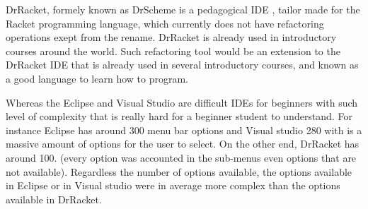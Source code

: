 DrRacket, formely known as DrScheme is a pedagogical IDE \cite{drscheme} \cite{drscheme_pegadogy},
tailor made for the Racket programming language, which currently does not
have refactoring operations exept from the rename.
DrRacket is already used in introductory courses around the world.
Such refactoring tool would be an extension to the DrRacket IDE that is already
used in several introductory courses, and known as a good language to learn how to program.

Whereas the Eclipse and Visual Studio are difficult IDEs for beginners with such level of
complexity that is really hard for a beginner student to understand.
For instance Eclipse has around 300 menu bar options and Visual studio 280 with is a massive amount
of options for the user to select.
On the other end, DrRacket has around 100. (every option was accounted in the sub-menus %
even options that are not available).
Regardless the number of options available, the options available in Eclipse or
in Visual studio were in average more complex than the options available in DrRacket.


